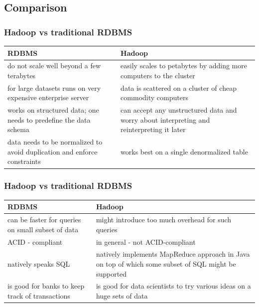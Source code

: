 \documentclass{beamer}
\begin{document}
\subsection{Comparison}
\begin{frame}
  \frametitle{Hadoop vs traditional RDBMS}
  \begin{center}

    \begin{tabulary}{\textwidth}{L | L}
      \hline
      {\color{mycolordef}\textbf{RDBMS}} & {\color{mycolordef}\textbf{Hadoop}} \\ \hline
      do not scale well beyond a few terabytes & easily scales to petabytes by adding more computers to the cluster \\ \hline
      for large datasets runs on very expensive enterprise server & data is scattered on a cluster of cheap commodity computers \\ \hline
      works on structured data; one needs to predefine the data schema & can accept any unstructured data and worry about interpreting and reinterpreting it later \\ \hline
      data needs to be normalized to avoid duplication and enforce constraints & works best on a single denormalized table \\ \hline

    \end{tabulary}

  \end{center}
\end{frame}

\begin{frame}
  \frametitle{Hadoop vs traditional RDBMS}
  \begin{center}

    \begin{tabulary}{\textwidth}{L | L}
      \hline
      {\color{mycolordef}\textbf{RDBMS}} & {\color{mycolordef}\textbf{Hadoop}} \\ \hline
      can be faster for queries on small subset of data & might introduce too much overhead for such queries \\ \hline
      ACID - compliant & in general - not ACID-compliant \\ \hline
      natively speaks SQL & natively implements MapReduce approach in Java on top of which some subset of SQL might be supported \\ \hline 
      is good for banks to keep track of transactions & is good for data scientists to try various ideas on a huge sets of data  \\ \hline
    \end{tabulary}

  \end{center}
\end{frame}
\end{document}
